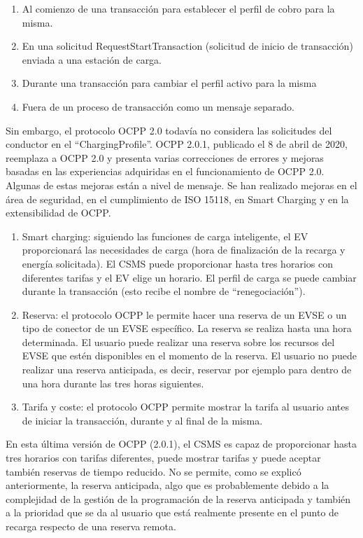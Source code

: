 \documentclass[12pt,a4paper,onecolumn,oneside]{report}
\begin{document}
\begin{enumerate}

\item Al comienzo de una transacción para establecer el perfil de cobro para la misma.
\item En una solicitud RequestStartTransaction (solicitud de inicio de transacción) enviada a una estación de carga.
\item Durante una transacción para cambiar el perfil activo para la misma
\item Fuera de un proceso de transacción como un mensaje separado.

\end{enumerate}

Sin embargo, el protocolo OCPP 2.0 todavía no considera las solicitudes del conductor en el ``ChargingProfile”. OCPP 2.0.1, publicado el 8 de abril de 2020, reemplaza a OCPP 2.0 y presenta varias correcciones de errores y mejoras basadas en las experiencias adquiridas en el funcionamiento de OCPP 2.0. Algunas de estas mejoras están a nivel de mensaje. Se han realizado mejoras en el área de seguridad, en el cumplimiento de ISO 15118, en Smart Charging y en la extensibilidad de OCPP.

\begin{enumerate}

\item Smart charging: siguiendo las funciones de carga inteligente, el EV proporcionará las necesidades de carga (hora de finalización de la recarga y energía solicitada). El CSMS puede proporcionar hasta tres horarios con diferentes tarifas y el EV elige un horario. El perfil de carga se puede cambiar durante la transacción (esto recibe el nombre de ``renegociación”).
\item Reserva: el protocolo OCPP le permite hacer una reserva de un EVSE o un tipo de conector de un EVSE específico. La reserva se realiza hasta una hora determinada. El usuario puede realizar una reserva sobre los recursos del EVSE que estén disponibles en el momento de la reserva. El usuario no puede realizar una reserva anticipada, es decir, reservar por ejemplo para dentro de una hora durante las tres horas siguientes.
\item Tarifa y coste: el protocolo OCPP permite mostrar la tarifa al usuario antes de iniciar la transacción, durante y al final de la misma.

\end{enumerate}

En esta última versión de OCPP (2.0.1), el CSMS es capaz de proporcionar hasta tres horarios con tarifas diferentes, puede mostrar tarifas y puede aceptar también reservas de tiempo reducido. No se permite, como se explicó anteriormente, la reserva anticipada, algo que es probablemente debido a la complejidad de la gestión de la programación de la reserva anticipada y también a la prioridad que se da al usuario que está realmente presente en el punto de recarga respecto de una reserva remota.
\end{document}
